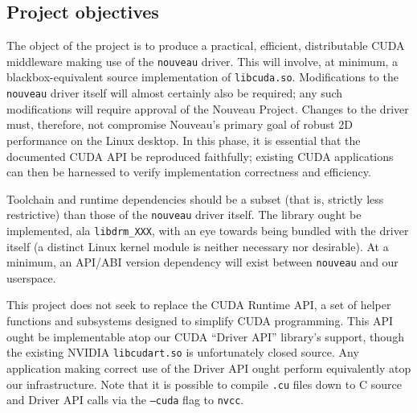 \documentclass[letterpaper,10pt]{article}
\begin{document}
\begin{multicols}{2}
\section{Project objectives}
The object of the project is to produce a practical, efficient, distributable
CUDA middleware making use of the \texttt{nouveau} driver. This will involve,
at minimum, a blackbox-equivalent source implementation of \texttt{libcuda.so}.
Modifications to the \texttt{nouveau} driver itself will almost certainly also
be required; any such modifications will require approval of the Nouveau Project.
Changes to the driver must, therefore, not compromise Nouveau's primary goal of
robust 2D performance on the Linux desktop. In this phase, it is essential that
the documented CUDA API be reproduced faithfully; existing CUDA applications can
then be harnessed to verify implementation correctness and efficiency.

Toolchain and runtime dependencies should be a subset (that is, strictly less
restrictive) than those of the \texttt{nouveau} driver itself. The library
ought be implemented, ala \texttt{libdrm\_XXX}, with an eye towards being bundled
with the driver itself (a distinct Linux kernel module is neither necessary nor
desirable). At a minimum, an API/ABI version dependency will exist between
\texttt{nouveau} and our userspace.

This project does not seek to replace the CUDA Runtime API, a set of helper
functions and subsystems designed to simplify CUDA programming. This API ought
be implementable atop our CUDA ``Driver API'' library's support, though the
existing NVIDIA \texttt{libcudart.so} is unfortunately closed source. Any
application making correct use of the Driver API ought perform equivalently atop
our infrastructure. Note that it is possible to compile \texttt{.cu} files down
to C source and Driver API calls via the \texttt{--cuda} flag to \texttt{nvcc}\cite{nvcc}.



\end{multicols}
\end{document}
